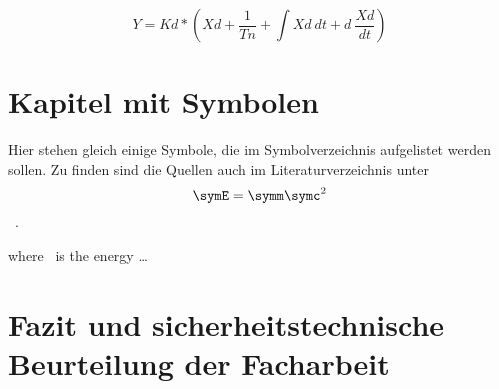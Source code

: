 \begin{equation}
    \label{eq:Eq10}
    Y=Kd \ast \left(Xd + \frac{1}{Tn} + \int Xd\ dt + d\ \frac{Xd}{dt}\right)
\end{equation}


\newpage
\chapter{Kapitel mit Symbolen}

Hier stehen gleich einige Symbole, die im Symbolverzeichnis aufgelistet werden sollen. Zu finden sind die Quellen auch im Literaturverzeichnis unter~\cite[S.~49]{Wittel.2021b}
\[\symE=\symm \symc^2\]~\cite{VerbandderTUVe.V..2020}.

where \symE~is the energy \ldots


\newpage
\chapter{Fazit und sicherheitstechnische Beurteilung der Facharbeit}
\blindtext{}
\par
\blindtext{}
